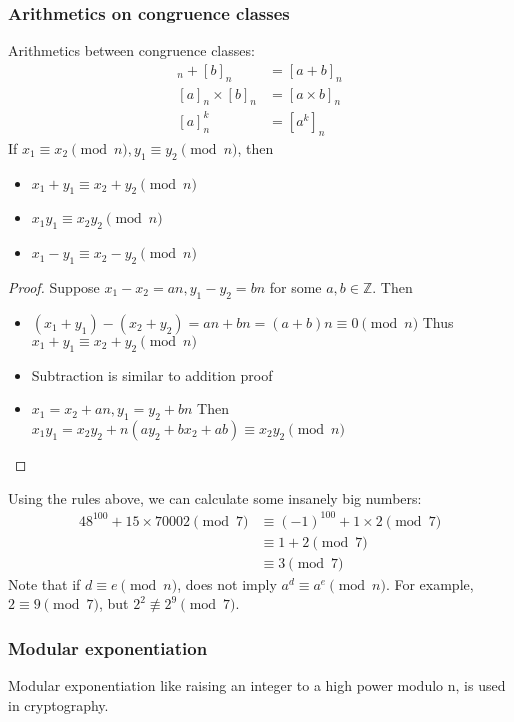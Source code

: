 \documentclass[letterpaper,12pt,oneside]{article}
\begin{document}
\subsubsection{Arithmetics on congruence classes}
Arithmetics between congruence classes: \begin{align*}
    [a]_n + [b]_n      & = [a+b]_n        \\
    [a]_n \times [b]_n & = [a \times b]_n \\
    [a]_n^k            & = [a^k]_n
\end{align*}
If $x_1 \equiv x_2 \pmod n, y_1 \equiv y_2 \pmod n$, then \begin{itemize}
    \item $x_1 + y_1 \equiv x_2 + y_2 \pmod n$
    \item $x_1y_1 \equiv x_2y_2 \pmod n$
    \item $x_1 - y_1 \equiv x_2 - y_2 \pmod n$
\end{itemize}
\begin{proof}
    Suppose $x_1-x_2=an,y_1-y_2=bn$ for some $a,b \in \mathbb{Z}$. Then
    \begin{itemize}
        \item $(x_1+y_1)-(x_2+y_2)=an+bn=(a+b)n\equiv 0 \pmod n$ Thus $x_1+y_1\equiv x_2+y_2 \pmod n$
        \item Subtraction is similar to addition proof
        \item $x_1=x_2+an,y_1=y_2+bn$ Then $x_1y_1=x_2y_2+n(a y_2+b x_2+ab)\equiv x_2y_2 \pmod n$
    \end{itemize}
\end{proof}
Using the rules above, we can calculate some insanely big numbers: \begin{align*}
    48^{100}+15\times 70002 \pmod 7 & \equiv (-1)^{100}+1\times 2 \pmod 7 \\
                                    & \equiv 1+2 \pmod 7                  \\
                                    & \equiv 3 \pmod 7
\end{align*}
Note that if $d\equiv e \pmod n$, does not imply $a^d\equiv a^e \pmod n$. For example, $2\equiv 9 \pmod 7$, but $2^2\not\equiv 2^9 \pmod 7$.
\subsubsection{Modular exponentiation}
Modular exponentiation like raising an integer to a high power modulo n, is
used in cryptography.
\end{document}
